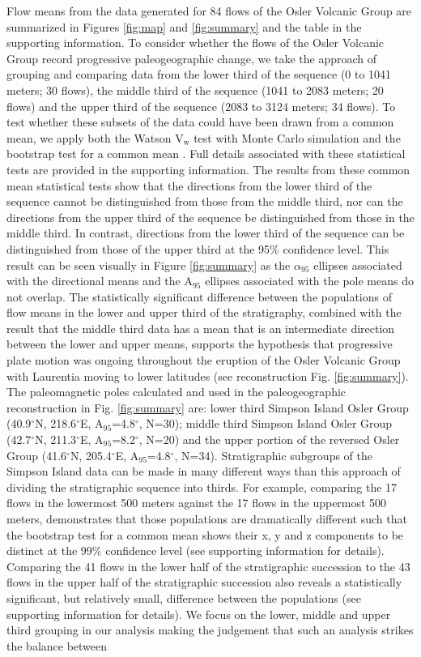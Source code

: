 \documentclass[draft,gc]{AGUTeX}
\begin{document}
\begin{article}
Flow means from the data generated for 84 flows of the Osler Volcanic Group are summarized in Figures \ref{fig:map} and \ref{fig:summary} and the table in the supporting information. To consider whether the flows of the Osler Volcanic Group record progressive paleogeographic change, we take the approach of grouping and comparing data from the lower third of the sequence (0 to 1041 meters; 30 flows), the middle third of the sequence (1041 to 2083 meters; 20 flows) and the upper third of the sequence (2083 to 3124 meters; 34 flows). To test whether these subsets of the data could have been drawn from a common mean, we apply both the Watson V$_{\mathrm w}$ test with Monte Carlo simulation \citep{Watson1983a} and the bootstrap test for a common mean \citep{Tauxe2010a}. Full details associated with these statistical tests are provided in the supporting information. The results from these common mean statistical tests show that the directions from the lower third of the sequence cannot be distinguished from those from the middle third, nor can the directions from the upper third of the sequence be distinguished from those in the middle third. In contrast, directions from the lower third of the sequence can be distinguished from those of the upper third at the 95$\%$ confidence level. This result can be seen visually in Figure \ref{fig:summary} as the $\alpha_{95}$ ellipses associated with the directional means and the A$_{95}$ ellipses associated with the pole means do not overlap. The statistically significant difference between the populations of flow means in the lower and upper third of the stratigraphy, combined with the result that the middle third data has a mean that is an intermediate direction between the lower and upper means, supports the hypothesis that progressive plate motion was ongoing throughout the eruption of the Osler Volcanic Group with Laurentia moving to lower latitudes (see reconstruction Fig. \ref{fig:summary}). The paleomagnetic poles calculated and used in the paleogeographic reconstruction in Fig. \ref{fig:summary} are: lower third Simpson Island Osler Group (40.9$^\circ$N, 218.6$^\circ$E, A$_{95}$=4.8$^\circ$, N=30); middle third Simpson Island Osler Group (42.7$^\circ$N, 211.3$^\circ$E, A$_{95}$=8.2$^\circ$, N=20)  and the upper portion of the reversed Osler Group (41.6$^\circ$N, 205.4$^\circ$E, A$_{95}$=4.8$^\circ$, N=34). Stratigraphic subgroups of the Simpson Island data can be made in many different ways than this approach of dividing the stratigraphic sequence into thirds. For example, comparing the 17 flows in the lowermost 500 meters against the 17 flows in the uppermost 500 meters, demonstrates that those populations are dramatically different such that the bootstrap test for a common mean shows their x, y and z components to be distinct at the 99$\%$ confidence level (see supporting information for details). Comparing the 41 flows in the lower half of the stratigraphic succession to the 43 flows in the upper half of the stratigraphic succession also reveals a statistically significant, but relatively small, difference between the populations (see supporting information for details). We focus on the lower, middle and upper third grouping in our analysis making the judgement that such an analysis strikes the balance between 
\end{article}
\end{document}
